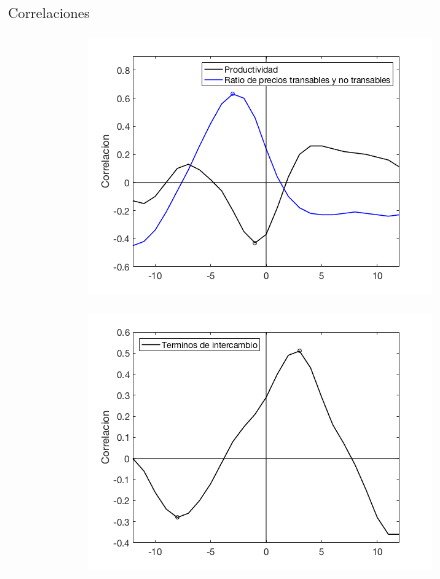 \documentclass{beamer}
\begin{document}
\begin{frame}{Correlaciones}
\begin{figure}
    \begin{subfigure}[b]{0.31\textwidth}
        \includegraphics[width=\textwidth]{fig16}
    \end{subfigure}
   \begin{subfigure}[b]{0.31\textwidth}
       \includegraphics[width=\textwidth]{fig17}
    \end{subfigure}
        ~ %
   \begin{subfigure}[b]{0.31\textwidth}

\end{subfigure}
\end{figure}
\end{frame}
\end{document}
